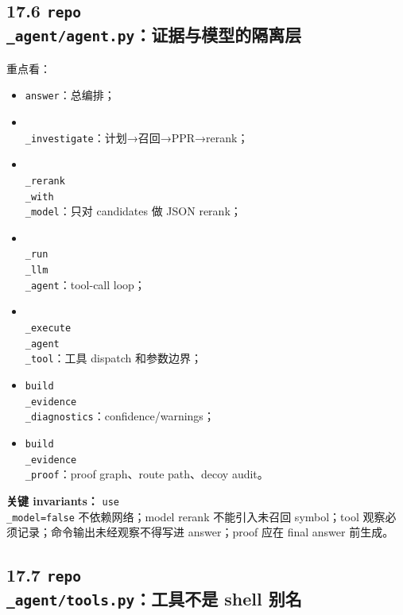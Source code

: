 \documentclass[UTF8,12pt,openany]{ctexbook}
\begin{document}
\subsection{17.6 \texttt{repo\\_agent/agent.py}：证据与模型的隔离层}

重点看：\par

\begin{itemize}
\item \texttt{answer}：总编排；
\item \texttt{\\_investigate}：计划→召回→PPR→rerank；
\item \texttt{\\_rerank\\_with\\_model}：只对 candidates 做 JSON rerank；
\item \texttt{\\_run\\_llm\\_agent}：tool-call loop；
\item \texttt{\\_execute\\_agent\\_tool}：工具 dispatch 和参数边界；
\item \texttt{build\\_evidence\\_diagnostics}：confidence/warnings；
\item \texttt{build\\_evidence\\_proof}：proof graph、route path、decoy audit。
\end{itemize}

\textbf{关键 invariants：} \texttt{use\\_model=false} 不依赖网络；model rerank 不能引入未召回 symbol；tool 观察必须记录；命令输出未经观察不得写进 answer；proof 应在 final answer 前生成。\par

\subsection{17.7 \texttt{repo\\_agent/tools.py}：工具不是 shell 别名}
\end{document}
